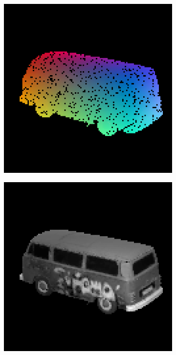 \begin{figure}
	
	\begin{subfigure}[b]{0.19\linewidth}
		\includegraphics[width=\linewidth]{./Figures/gcnn_synthetic/fancy_eval_9_point_cloud_noise.png}
	\end{subfigure}
	\begin{subfigure}[b]{0.19\linewidth}
	\includegraphics[width=\linewidth]{./Figures/gcnn_synthetic/fancy_eval_9_img.png}

\end{subfigure}
\end{figure}

